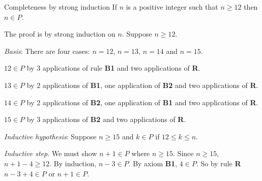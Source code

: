 \documentclass[style=sailor,size=12pt]{powerdot}
\begin{document}
\begin{wideslide}[bm=,toc=]{Completeness by strong induction}
If $n$ is a positive integer such that $n\geq 12$ then $n\in P$.

\vspace{1em}
The proof is by strong induction on $n$.
Suppose $n\geq 12$.

\vspace{1em}
{\em Basis\/}: There are four cases: $n=12$, $n=13$, $n=14$ and $n=15$.

\vspace{1em}
$12\in P$ by 3 applications of rule {\bf B1} and two applications of {\bf R}.

$13\in P$ by 2 applications of {\bf B1}, one application of {\bf B2} and two applications of {\bf R}.

$14\in P$ by 2 applications of {\bf B2}, one application of {\bf B1} and two applications of {\bf R}.

$15\in P$ by 3 applications of {\bf B2} and two applications of {\bf R}.

\vspace{1em}
{\em Inductive hypothesis\/}:  Suppose $n\geq 15$ and $k\in P$ if $12\leq k \leq n$.

\vspace{1em}
{\em Inductive step}.
We must show $n+1\in P$ where $n\geq 15$.
Since $n\geq 15$, $n+1-4\geq 12$.
By induction, $n-3\in P$.
By axiom {\bf B1}, $4\in P$.
So by rule {\bf R} $n-3+4\in P$ or $n+1\in P$.
\end{wideslide}
\end{document}
